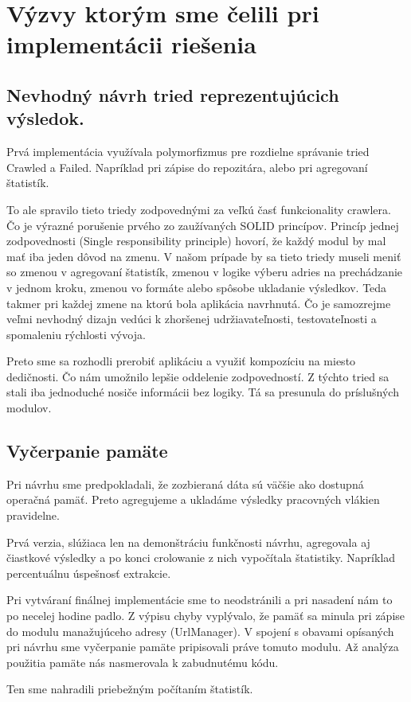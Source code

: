 \section{Výzvy ktorým sme čelili pri implementácii riešenia}

\subsection{Nevhodný návrh tried reprezentujúcich výsledok.}
Prvá implementácia využívala polymorfizmus pre rozdielne správanie tried Crawled a Failed. Napríklad pri zápise do repozitára, alebo pri agregovaní štatistík. 

To ale spravilo tieto triedy zodpovednými za veľkú časť funkcionality crawlera. Čo je výrazné porušenie prvého zo zaužívaných SOLID princípov. Princíp jednej zodpovednosti (Single responsibility principle) hovorí, že každý modul by mal mať iba jeden dôvod na zmenu. V našom prípade by sa tieto triedy museli meniť so zmenou v agregovaní štatistík, zmenou v logike výberu adries na prechádzanie v jednom kroku, zmenou vo formáte alebo spôsobe ukladanie výsledkov. Teda takmer pri každej zmene na ktorú bola aplikácia navrhnutá. Čo je samozrejme veľmi nevhodný dizajn vedúci k zhoršenej udržiavateľnosti, testovateľnosti a spomaleniu rýchlosti vývoja.  

Preto sme sa rozhodli prerobiť aplikáciu a využiť kompozíciu na miesto dedičnosti. Čo nám umožnilo lepšie oddelenie zodpovedností. Z týchto tried sa stali iba jednoduché nosiče informácii bez logiky. Tá sa presunula do príslušných modulov.

\subsection{Vyčerpanie pamäte}
Pri návrhu sme predpokladali, že zozbieraná dáta sú väčšie ako dostupná operačná pamäť. Preto agregujeme a ukladáme výsledky pracovných vlákien pravidelne. 

Prvá verzia, slúžiaca len na demonštráciu funkčnosti návrhu, agregovala aj čiastkové výsledky a po konci crolowanie z nich vypočítala štatistiky. Napríklad percentuálnu úspešnosť extrakcie. 

Pri vytváraní finálnej implementácie sme to neodstránili a pri nasadení nám to po necelej hodine padlo. Z výpisu chyby vyplývalo, že pamäť sa minula pri zápise do modulu manažujúceho adresy (UrlManager). V spojení s obavami opísaných pri návrhu sme vyčerpanie pamäte pripisovali práve tomuto modulu. Až analýza použitia pamäte nás nasmerovala k zabudnutému kódu. 

Ten sme nahradili priebežným počítaním štatistík. 